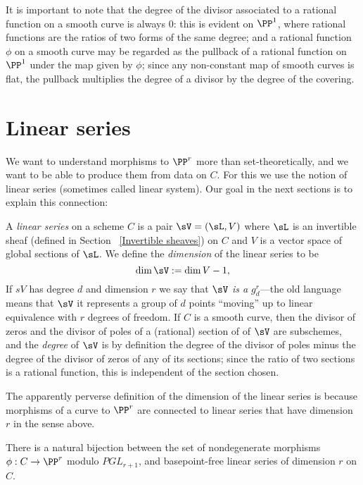 It is important to note that the degree of the divisor associated to a rational function on a smooth curve is always 0: this is evident on $\PP^1$, where rational 
functions are the ratios of two forms of the same degree; and a rational function $\phi$ on a smooth curve may be regarded as the pullback of a rational function
on $\PP^1$ under the map given by $\phi$; since any non-constant map of smooth curves is flat, the pullback multiplies the degree of a divisor by the degree 
of the covering. 

\section{Linear series}

We want to understand morphisms to $\PP^r$ more than set-theoretically, and we want to be able to produce them from data on $C$. For this we use the notion of linear series (sometimes called linear system). Our goal in the next sections is to explain this connection:

\begin{definition}
 A \emph{linear series} on a scheme $C$ is a pair $\sV  = (\sL, V)$ where $\sL$ is an invertible sheaf (defined in Section ~\ref{Invertible sheaves}) on $C$ and
 $V$ is a vector space of global sections of $\sL$. We define the \emph{dimension} of the linear series to be 
 $$
 \dim \sV := \dim V -1,
 $$
If $sV$ has degree $d$ and dimension $r$ we say that \emph{$\sV$ is a $g^r_d$}---the old language means that $\sV$ it represents a group of $d$ points ``moving'' up to linear equivalence with $r$ degrees of freedom. If $C$ is a smooth curve, then the divisor of zeros and the divisor of poles of a (rational) section of of $\sV$ are subschemes, and the \emph{degree} of $\sV$ is by definition the degree of the divisor of poles minus the degree of the divisor of zeros of any of its sections; since the 
 ratio of two sections is a rational function, this is independent of the section chosen. \end{definition}

The apparently perverse definition of the dimension of the linear series is because morphisms of a curve to $\PP^r$ are connected to linear series that have dimension $r$ in the sense above.

\begin{theorem}\label{morphisms and linear series}
There is a natural bijection between the set of nondegenerate morphisms $\phi : C \to \PP^r$ modulo $PGL_{r+1}$, and basepoint-free linear series of dimension $r$ on $C$.\end{theorem}

